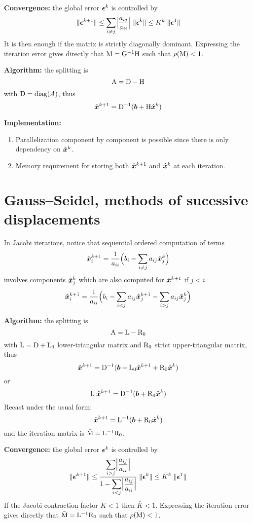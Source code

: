\medskip
\textbf{Convergence:} the global error ${\boldsymbol \epsilon}^k$ is controlled by
\begin{equation*}
{\lVert {\boldsymbol \epsilon}^{k+1} \rVert} \leq \sum_{i\neq j} \Bigl\lvert\frac{a_{ij}}{a_{ii}}\Bigr\rvert\;{\lVert {\boldsymbol \epsilon}^{k} \rVert} \leq K^k \; {\lVert {\boldsymbol \epsilon}^{1} \rVert}
\end{equation*}
It is then enough if the matrix is strictly diagonally dominant.
Expressing the iteration error gives directly that ${\mathrm M} = {\mathrm G}^{-1}{\mathrm H}$ such that $\rho({\mathrm M})< 1$.

\medskip
\textbf{Algorithm:} the splitting is
\[
{\mathrm A} = {\mathrm D} - {\mathrm H}
\]
with ${\mathrm D} = \mathrm{diag}(A)$, thus
\[
\hat{\boldsymbol x}^{k+1} = {\mathrm D}^{-1}({\boldsymbol b} + {\mathrm H} \hat{\boldsymbol x}^{k})
\]

\medskip
\textbf{Implementation:}
\begin{enumerate}
\item Parallelization component by component is possible since there is only dependency on $\hat{\boldsymbol x}^{k}$.
\item Memory requirement for storing both $\hat{\boldsymbol x}^{k+1}$ and $\hat{\boldsymbol x}^{k}$ at each iteration.
\end{enumerate}

\section{Gauss--Seidel, methods of sucessive displacements}

In Jacobi iterations, notice that sequential ordered computation of terms
\begin{equation}
\hat{\boldsymbol x}^{k+1}_i = \frac{1}{a_{ii}}\Bigl( b_i - \sum_{i\neq j} a_{ij} \hat{\boldsymbol x}^{k}_j \Bigr)
\end{equation}
involves components $\hat{\boldsymbol x}^{k}_j$ which are also computed for $\hat{\boldsymbol x}^{k+1}$ if $j < i$.
\begin{equation}
\hat{\boldsymbol x}^{k+1}_i = \frac{1}{a_{ii}}\Bigl( b_i - \sum_{i < j} a_{ij} \hat{\boldsymbol x}^{k+1}_j - \sum_{i > j} a_{ij} \hat{\boldsymbol x}^{k}_j \Bigr)
\end{equation}

\medskip
\textbf{Algorithm:} the splitting is
\[
{\mathrm A} = {\mathrm L} - {\mathrm R_0}
\]
with ${\mathrm L} = {\mathrm D} + {\mathrm L_0}$ lower-triangular matrix and ${\mathrm R_0}$ strict upper-triangular matrix, thus
\[
\hat{\boldsymbol x}^{k+1} = {\mathrm D}^{-1}({\boldsymbol b} - {\mathrm L_0} \hat{\boldsymbol x}^{k+1} + {\mathrm R_0} \hat{\boldsymbol x}^{k})
\]
or
\[
{\mathrm L}\;\hat{\boldsymbol x}^{k+1} = {\mathrm D}^{-1}({\boldsymbol b} + {\mathrm R_0} \hat{\boldsymbol x}^{k})
\]
Recast under the usual form:
\[
\hat{\boldsymbol x}^{k+1} = {\mathrm L}^{-1}({\boldsymbol b} + {\mathrm R_0} \hat{\boldsymbol x}^{k})
\]
and the iteration matrix is $\bar {{\mathrm M}} = {\mathrm L}^{-1}{\mathrm R_0}$.

\medskip
\textbf{Convergence:} the global error ${\boldsymbol \epsilon}^k$ is controlled by
\begin{equation*}
{\lVert {\boldsymbol \epsilon}^{k+1} \rVert} \leq \frac{\displaystyle\sum_{i > j} \Bigl\lvert\frac{a_{ij}}{a_{ii}}\Bigr\rvert}{1 - \displaystyle\sum_{i < j} \Bigl\lvert\frac{a_{ij}}{a_{ii}}\Bigr\rvert}\;{\lVert {\boldsymbol \epsilon}^{k} \rVert} \leq \bar{K}^k \; {\lVert {\boldsymbol \epsilon}^{1} \rVert}
\end{equation*}
If the Jacobi contraction factor $K < 1$ then $\bar{K} < 1$.
Expressing the iteration error gives directly that $\bar{{\mathrm M}} = {\mathrm L}^{-1}{\mathrm R_0}$ such that $\rho(\bar{{\mathrm M}})< 1$.


